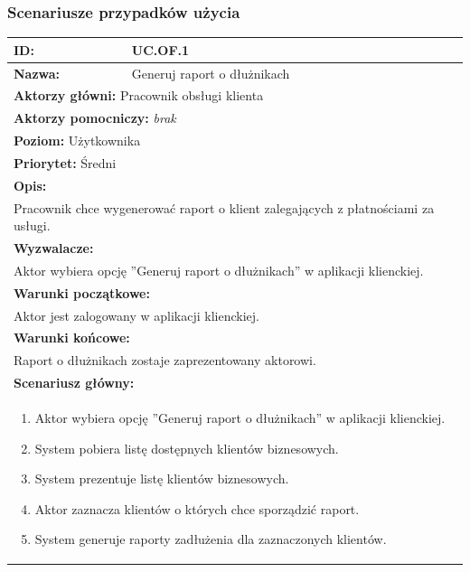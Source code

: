 \subsubsection*{Scenariusze przypadków użycia}
\begin{center}
\begin{longtable}[h]{|p{1.6cm}|p{13.5cm}|}
\hline
\textbf{ID:} & UC.OF.1 \\ \hline
\textbf{Nazwa:} & Generuj raport o dłużnikach \\ \hline
\multicolumn{2}{|p{15.1cm}|}{\textbf{Aktorzy główni:} Pracownik obsługi klienta} \\
\multicolumn{2}{|p{15.1cm}|}{\textbf{Aktorzy pomocniczy:} 
\textit{brak}} \\
\multicolumn{2}{|p{15.1cm}|}{\textbf{Poziom:} Użytkownika} \\
\multicolumn{2}{|p{15.1cm}|}{\textbf{Priorytet:} Średni} \\
\hline
\multicolumn{2}{|p{15.1cm}|}{\textbf{Opis:}} \\
\multicolumn{2}{|p{15.1cm}|}{
Pracownik chce wygenerować raport o klient zalegających z płatnościami za usługi.
} \\ \hline
\multicolumn{2}{|p{15.1cm}|}{\textbf{Wyzwalacze:}} \\
\multicolumn{2}{|p{15.1cm}|}{
Aktor wybiera opcję ''Generuj raport o dłużnikach'' w aplikacji klienckiej.
} \\ \hline
\multicolumn{2}{|p{15.1cm}|}{\textbf{Warunki początkowe:}} \\
\multicolumn{2}{|p{15.1cm}|}{
Aktor jest zalogowany w aplikacji klienckiej.
} \\ \hline
\multicolumn{2}{|p{15.1cm}|}{\textbf{Warunki końcowe:}} \\
\multicolumn{2}{|p{15.1cm}|}{
Raport o dłużnikach zostaje zaprezentowany aktorowi.
} \\ \hline
\multicolumn{2}{|p{15.1cm}|}{\textbf{Scenariusz główny:}} \\
\multicolumn{2}{|p{15.1cm}|}{
\begin{enumerate}
\item Aktor wybiera opcję ''Generuj raport o dłużnikach'' w aplikacji klienckiej.
\item System pobiera listę dostępnych klientów biznesowych.
\item System prezentuje listę klientów biznesowych.
\item Aktor zaznacza klientów o których chce sporządzić raport.
\item System generuje raporty zadłużenia dla zaznaczonych klientów.

\end{enumerate}}
\end{longtable}
\end{center}
